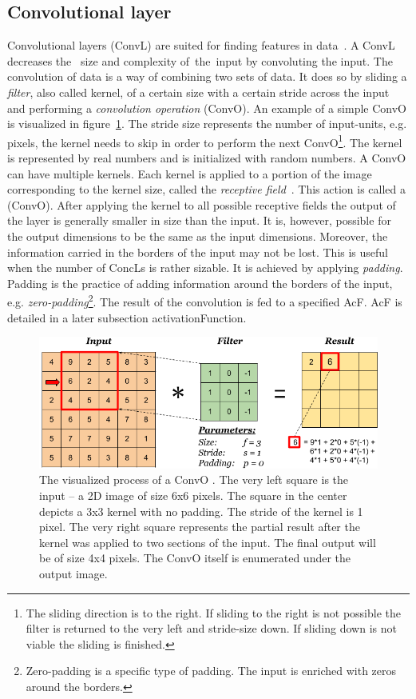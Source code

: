 \subsection{Convolutional layer}\label{convolutionalLayers}
Convolutional layers (ConvL) are suited for finding features in data~\cite{CNN}. A ConvL decreases the~ size and complexity of~the~input by convoluting the input. The convolution of data is a way of combining two sets of data.  It does so by sliding a \textit{filter}, also called kernel, of a certain size with a certain stride across the input and performing a \textit{convolution operation} (ConvO). An example of a simple ConvO is visualized in figure~\ref{convolutionalLayerVisualization}. The stride size represents the number of input-units, e.g. pixels, the kernel needs to skip in order to perform the next ConvO\footnote{The sliding direction is to the right. If sliding to the right is not possible the filter is returned to the very left and stride-size down. If sliding down is not viable the sliding is finished.}. The kernel is represented by real numbers and is initialized with random numbers. A ConvO can have multiple kernels. Each kernel is applied to a portion of the image corresponding to the kernel size, called the \textit{receptive field}~\cite{receptiveField}. This action is called a (ConvO). After applying the kernel to all possible receptive fields the output of the layer is generally smaller in size than the input. It is, however, possible for the output dimensions to be the same as the input dimensions. Moreover, the information carried in the borders of the input may not be lost. This is useful when the number of ConcLs is rather sizable. It is achieved by applying \textit{padding}. Padding is the practice of adding information around the borders of the input, e.g. \textit{zero-padding}\footnote{Zero-padding is a specific type of padding. The input is enriched with zeros around the borders.}. The result of the convolution is fed to a specified AcF. AcF is detailed in a later subsection {activationFunction}.
\begin{figure}[ht!]
  \centering
  \includegraphics[width=\textwidth]{Images/convolutionOperation.png}
  \caption{The visualized process of a ConvO \cite{convolutionOperationVisualization}. The very left square is the input -- a 2D image of size 6x6 pixels. The square in the center depicts a 3x3 kernel with no padding. The stride of the kernel is 1 pixel. The very right square represents the partial result after the kernel was applied to two sections of the input. The final output will be of size 4x4 pixels. The ConvO itself is enumerated under the output image.} 
  \label{convolutionalLayerVisualization}
\end{figure} 

